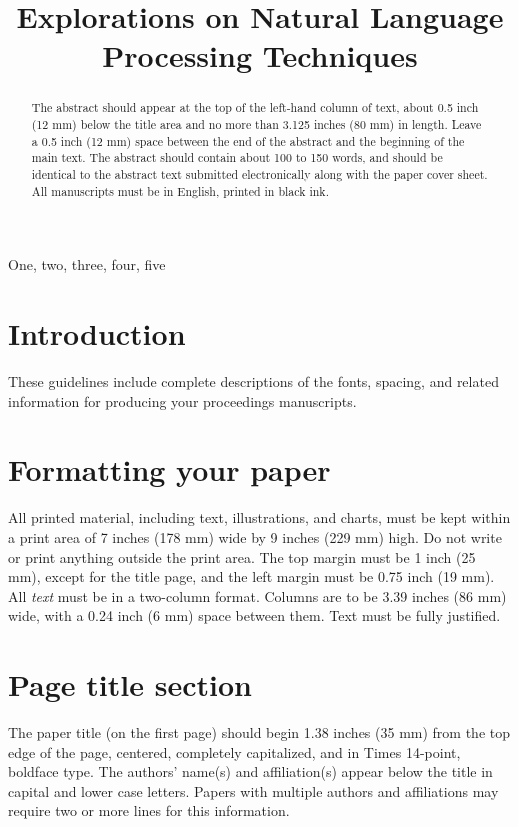 \documentclass{article}
\title{Explorations on Natural Language Processing Techniques}
\begin{document}
%
\maketitle
%
\begin{abstract}
The abstract should appear at the top of the left-hand column of text, about
0.5 inch (12 mm) below the title area and no more than 3.125 inches (80 mm) in
length.  Leave a 0.5 inch (12 mm) space between the end of the abstract and the
beginning of the main text.  The abstract should contain about 100 to 150
words, and should be identical to the abstract text submitted electronically
along with the paper cover sheet.  All manuscripts must be in English, printed
in black ink.
\end{abstract}
%
\begin{keywords}
One, two, three, four, five
\end{keywords}
%
\section{Introduction}
\label{sec:intro}

These guidelines include complete descriptions of the fonts, spacing, and
related information for producing your proceedings manuscripts.

\section{Formatting your paper}
\label{sec:format}

All printed material, including text, illustrations, and charts, must be kept
within a print area of 7 inches (178 mm) wide by 9 inches (229 mm) high. Do
not write or print anything outside the print area. The top margin must be 1
inch (25 mm), except for the title page, and the left margin must be 0.75 inch
(19 mm).  All {\it text} must be in a two-column format. Columns are to be 3.39
inches (86 mm) wide, with a 0.24 inch (6 mm) space between them. Text must be
fully justified.

\section{Page title section}
\label{sec:pagestyle}

The paper title (on the first page) should begin 1.38 inches (35 mm) from the
top edge of the page, centered, completely capitalized, and in Times 14-point,
boldface type.  The authors' name(s) and affiliation(s) appear below the title
in capital and lower case letters.  Papers with multiple authors and
affiliations may require two or more lines for this information.
\end{document}
